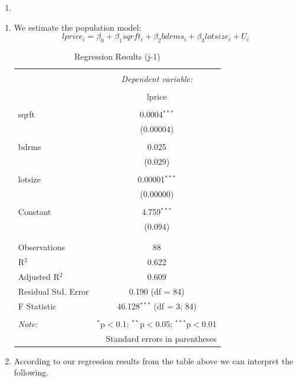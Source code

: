 \documentclass[
  12pt,
  landscape]{article}
\providecommand{\tightlist}{%
  \setlength{\itemsep}{0pt}\setlength{\parskip}{0pt}}
\begin{document}
\begin{enumerate}
\def\labelenumi{(\alph{enumi})}
\setcounter{enumi}{9}
\item
\end{enumerate}

\begin{enumerate}
\def\labelenumi{\roman{enumi})}
\tightlist
\item
  We estimate the population model: \[
  lprice_i = \beta_0 + \beta_1sqrft_i + \beta_2bdrms_i + \beta_3lotsize_i + U_i
  \]

  \begin{table}[H] \centering 
    \caption{Regression Results (j-1)} 
    \label{} 
  \begin{tabular}{@{\extracolsep{5pt}}lc} 
  \\[-1.8ex]\hline 
  \hline \\[-1.8ex] 
   & \multicolumn{1}{c}{\textit{Dependent variable:}} \\ 
  \cline{2-2} 
  \\[-1.8ex] & lprice \\ 
  \hline \\[-1.8ex] 
   sqrft & 0.0004$^{***}$ \\ 
    & (0.00004) \\ 
    & \\ 
   bdrms & 0.025 \\ 
    & (0.029) \\ 
    & \\ 
   lotsize & 0.00001$^{***}$ \\ 
    & (0.00000) \\ 
    & \\ 
   Constant & 4.759$^{***}$ \\ 
    & (0.094) \\ 
    & \\ 
  \hline \\[-1.8ex] 
  Observations & 88 \\ 
  R$^{2}$ & 0.622 \\ 
  Adjusted R$^{2}$ & 0.609 \\ 
  Residual Std. Error & 0.190 (df = 84) \\ 
  F Statistic & 46.128$^{***}$ (df = 3; 84) \\ 
  \hline 
  \hline \\[-1.8ex] 
  \textit{Note:}  & \multicolumn{1}{r}{$^{*}$p$<$0.1; $^{**}$p$<$0.05; $^{***}$p$<$0.01} \\ 
   & \multicolumn{1}{r}{Standard errors in parentheses} \\ 
  \end{tabular} 
  \end{table}
\item
  According to our regression results from the table above we can
  interpret the following.
\end{enumerate}
\end{document}
